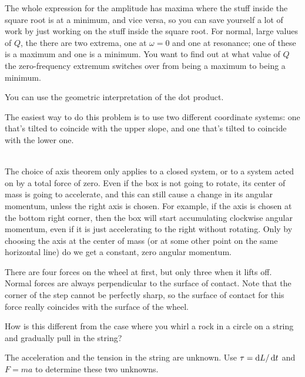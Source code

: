 \label{hwhint:maxampatdc}
The whole expression for the amplitude has maxima where the
stuff inside the square root is at a minimum, and vice versa, so
you can save yourself a lot of work by just working on the stuff
inside the square root. For normal, large values of $Q$, the
there are two extrema, one at $\omega=0$ and one at
resonance; one of these is a maximum and one is a minimum.
You want to find out at what value of $Q$ the zero-frequency extremum
switches over from being a maximum to being a minimum.

\label{hwhint:anglebetween}
You can use the geometric interpretation of the dot product.

\label{hwhint:ropeslopes}
The easiest way to do this problem is to use two different coordinate
systems: one that's tilted to coincide with the upper slope, and one that's
tilted to coincide with the lower one.

\noindent{}\\
\label{hwhint:tipbox}
The choice of axis theorem only applies to a closed system, or to a
system acted on by a total force of zero. Even if the box is not going
to rotate, its center of mass is going to accelerate,
and this can still cause a change in its angular momentum, unless
the right axis is chosen. For example, if the axis is chosen
at the bottom right corner, then the box will start accumulating
clockwise angular momentum, even if it is just accelerating to the
right without rotating. Only by choosing the axis at the center of
mass (or at some other point on the same horizontal line) do we get
a constant, zero angular momentum.

\label{hwhint:wheeloverstep}
There are four
forces on the wheel at first, but only three when it lifts
off. Normal forces are always perpendicular to the surface
of contact. Note that the corner of the step cannot be
perfectly sharp, so the surface of contact for this force
really coincides with the surface of the wheel.

\label{hwhint:tetherball}
How is this different
from the case where you whirl a rock in a circle on a string
and gradually pull in the string?


\label{hwhint:yoyo}
The acceleration and the tension in the string are unknown.
Use $\tau=\operatorname{d\!} L/\operatorname{d\!} t$ and $F=ma$ to determine these two unknowns.


